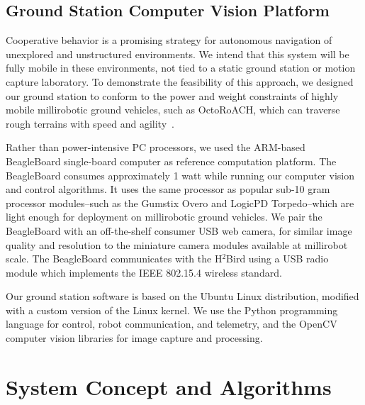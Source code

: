 \documentclass{aamas2013}
\begin{document}
\subsection{Ground Station Computer Vision Platform}
Cooperative behavior is a promising strategy for autonomous navigation of 
unexplored and unstructured environments. We intend that this system will be 
fully mobile in these environments, not tied to a static ground station or 
motion capture laboratory. To demonstrate the feasibility of this approach, 
we designed our ground station to conform to the power and weight 
constraints of highly mobile millirobotic ground vehicles, such as 
OctoRoACH, which can traverse rough terrains with speed and agility~\cite{Pullin2012Dynamic}. 

Rather than power-intensive PC processors, we used the ARM-based 
BeagleBoard single-board computer as reference computation platform. The
BeagleBoard consumes approximately 1 watt while running our computer vision 
and control algorithms. It uses the same processor as popular sub-10 gram 
processor modules--such as the Gumstix Overo and LogicPD Torpedo--which are 
light enough for deployment on millirobotic ground vehicles. We pair the 
BeagleBoard with an off-the-shelf consumer USB web camera, for similar image 
quality and resolution to the miniature camera modules available at 
millirobot scale. The BeagleBoard communicates with the H$^2$Bird using a 
USB radio module which implements the IEEE 802.15.4 wireless standard.

Our ground station software is based on the Ubuntu Linux distribution, 
modified with a custom version of the Linux kernel. We use the Python 
programming language for control, robot communication, and telemetry, and 
the OpenCV computer vision libraries for image capture and processing.
\section{System Concept and Algorithms}
\end{document}
